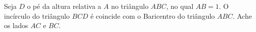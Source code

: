 Seja $D$ o pé da altura relativa a $A$ no triângulo $ABC$, no qual $AB = 1$. O incírculo do triângulo $BCD$ é coincide com o Baricentro do triângulo $ABC$. Ache os lados $AC$ e $BC$.